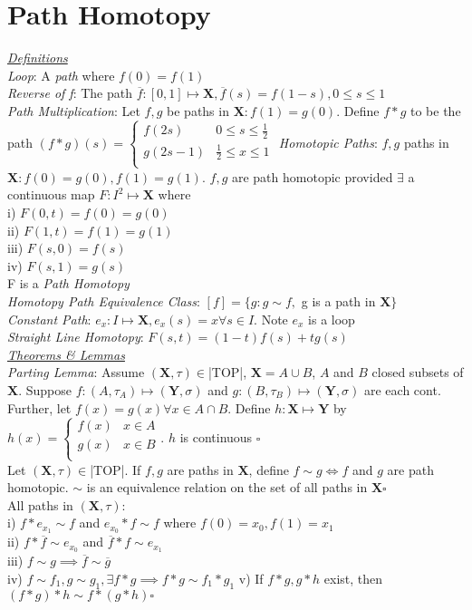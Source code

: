 \section{Path Homotopy}
\underline{\emph{Definitions}}\\
\emph{Loop}: A \emph{path} where $f(0)=f(1)$\\
\emph{Reverse of f}: The path $\overline{f}:[0,1]\mapsto\mathbf{X},\overline{f}(s)=f(1-s),0\leq s\leq 1$\\
\emph{Path Multiplication}: Let $f,g$ be paths in $\mathbf{X}:f(1)=g(0)$. Define $f*g$ to be the path $(f*g)(s)=
\begin{cases}
    f(2s) & 0\leq s\leq \frac{1}{2}\\
    g(2s-1) & \frac{1}{2}\leq x\leq 1\\
\end{cases}
$
\emph{Homotopic Paths}: $f,g$ paths in $\mathbf{X}:f(0)=g(0),f(1)=g(1)$. $f,g$ are path homotopic provided $\exists$ a continuous map $F:I^2\mapsto\mathbf{X}$ where\\
i) $F(0,t)=f(0)=g(0)$\\
ii) $F(1,t)=f(1)=g(1)$\\
iii) $F(s,0)=f(s)$\\
iv) $F(s,1)=g(s)$\\
F is a \emph{Path Homotopy}\\
\emph{Homotopy Path Equivalence Class}: $[f]=\{g:g\sim f,$ g is a path in $\mathbf{X}\}$\\
\emph{Constant Path}: $e_x:I\mapsto\mathbf{X},e_x(s)=x\forall s\in I$. Note $e_x$ is a loop\\
\emph{Straight Line Homotopy}: $F(s,t)=(1-t)f(s)+tg(s)$
\\\underline{\emph{Theorems \& Lemmas}}\\
\emph{Parting Lemma}: Assume $(\mathbf{X},\tau)\in$|TOP|, $\mathbf{X}=A\cup B$, $A$ and $B$ closed subsets of $\mathbf{X}$. Suppose $f:(A,\tau_A)\mapsto(\mathbf{Y},\sigma)$ and $g:(B,\tau_B)\mapsto(\mathbf{Y},\sigma)$ are each cont. Further, let $f(x)=g(x)\forall x\in A\cap B$. Define $h:\mathbf{X}\mapsto\mathbf{Y}$ by $h(x)=
\begin{cases}
    f(x) & x\in A\\
    g(x) & x\in B\\
\end{cases}$.  $h$ is continuous $\square$\\
Let $(\mathbf{X},\tau)\in$|TOP|. If $f,g$ are paths in $\mathbf{X}$, define $f\sim g\iff f$ and $g$ are path homotopic. $\sim $ is an equivalence relation on the set of all paths in $\mathbf{X} \square$\\
All paths in $(\mathbf{X},\tau)$:\\
i) $f*e_x_1\sim f$ and $e_x_0*f\sim f$ where $f(0)=x_0,f(1)=x_1$\\
ii) $f*\overline{f}\sim e_x_0$ and $\overline{f}*f\sim e_x_1$\\
iii) $f\sim g\implies\overline{f}\sim \overline{g}$\\
iv) $f\sim f_1,g\sim g_1,\exists f*g\implies f*g\sim f_1*g_1$
v) If $f*g,g*h$ exist, then $(f*g)*h\sim f*(g*h) \square$
